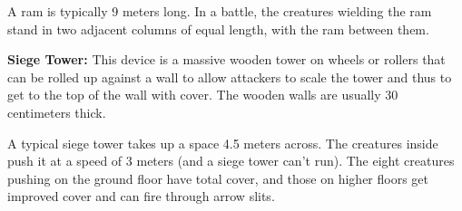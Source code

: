A ram is typically 9 meters long. In a battle, the creatures wielding the ram stand in two adjacent columns of equal length, with the ram between them.

\textbf{Siege Tower:} This device is a massive wooden tower on wheels or rollers that can be rolled up against a wall to allow attackers to scale the tower and thus to get to the top of the wall with cover. The wooden walls are usually 30 centimeters thick.

A typical siege tower takes up a space 4.5 meters across. The creatures inside push it at a speed of 3 meters (and a siege tower can't run). The eight creatures pushing on the ground floor have total cover, and those on higher floors get improved cover and can fire through arrow slits.

